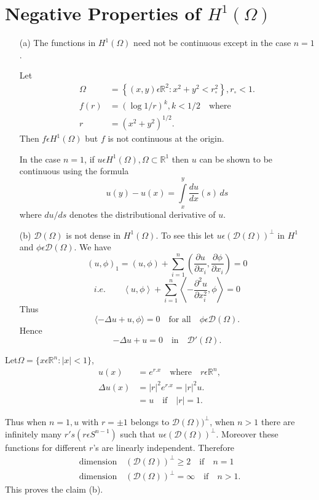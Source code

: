 \section{Negative Properties of $H^1(\Omega)$}\label{chap1:subsec1.4}

\begin{itemize}
\item [(a)] The functions in $H^1(\Omega)$ need not be continuous
  except in the case $n=1$.

\begin{exam}\label{chap1:exam3} 
Let 
\begin{align*}
\Omega&=\left\{(x, y)\epsilon\mathbb{R}^2:x^2+y^2 < r_\circ^2\right\}, r_\circ < 1.\\
f(r)&= (\log 1/r)^k, k< 1/2 \quad \text{where}\\
r&= (x^2+y^2)^{1/2}.
\end{align*}
Then $f\epsilon H^1(\Omega)$ but $f$ is not continuous at the
origin. 


In the case $n=1$, if $u\epsilon H^1(\Omega), \Omega\subset\mathbb{R}^1$
then $u$ can be shown to be continuous using the formula 
$$
u(y)-u(x)=\int\limits_x^y\frac{du}{dx}(s)\,ds
$$
where $du/ds$ denotes the distributional derivative of $u$.
\end{exam}

\item [(b)] $\mathscr{D}(\Omega)$ is not dense in $H^1(\Omega)$. To
  see this let $u\epsilon (\mathscr{D}(\Omega))^\bot$ in
  $H^1$ and $\phi\epsilon \mathscr{D}(\Omega)$. We have
$$
(u, \phi)_1=(u, \phi)+\sum\limits_{i=1}^n \left(\frac{\partial
 u}{\partial x_i}, \frac{\partial \phi}{\partial x_i}\right)=0 
$$
$$
i.e.\qquad  \left\langle u, \phi \right\rangle +\sum\limits_{i=1}^n 
\left\langle -\frac{\partial^2u}{\partial x_i^2}, \phi \right\rangle=0 $$
Thus 
$$
\langle -\Delta u +u, \phi \rangle=0 \quad \text{for all}\quad \phi \epsilon
\mathscr{D}(\Omega).
$$
Hence
$$
-\Delta u +u=0 \quad \text{in} \quad \mathscr{D}'(\Omega).
$$
\end{itemize}

Let\pageoriginale $\Omega = \{x\epsilon \mathbb{R}^n:|x|< 1\}$,
\begin{align*}
u(x)&= e^{r.x} \quad \text{where} \quad r \epsilon \mathbb{R}^n,\\
\Delta u(x)&= |r|^2 e^{r.x} = |r|^2 u.\\
&= u \quad \text{if} \quad |r|=1.
\end{align*}

Thus when $n=1, u$ with $r=\pm 1$ belongs to
$\mathscr{D}(\Omega))^\bot$, when $n>1$ there are infinitely many
$r's(r\epsilon S^{n-1})$ such that $u\epsilon
(\mathscr{D}(\Omega))^\bot$. Moreover these functions for different
$r$'s are linearly independent. Therefore 
\begin{align*}
\text{dimension}\quad (\mathscr{D}(\Omega))^\bot\geq 2 \quad \text{if}
\quad n=1\\
\text{dimension} \quad (\mathscr{D}(\Omega))^\bot =\infty \quad
\text{if} \quad n>1.
\end{align*}
This proves the claim (b).

